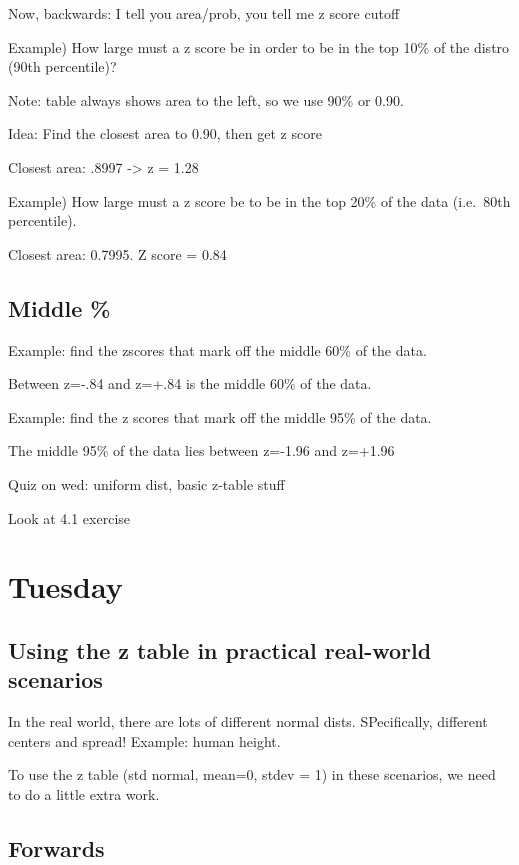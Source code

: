 \documentclass[]{article}
\begin{document}
Now, backwards: I tell you area/prob, you tell me z score cutoff

Example) How large must a z score be in order to be in the top 10\% of
the distro (90th percentile)?

Note: table always shows area to the left, so we use 90\% or 0.90.

Idea: Find the closest area to 0.90, then get z score

Closest area: .8997 -\textgreater{} z = 1.28

Example) How large must a z score be to be in the top 20\% of the data
(i.e.~80th percentile).

Closest area: 0.7995. Z score = 0.84

\hypertarget{middle}{%
\subsection{Middle \%}\label{middle}}

Example: find the zscores that mark off the middle 60\% of the data.

Between z=-.84 and z=+.84 is the middle 60\% of the data.

Example: find the z scores that mark off the middle 95\% of the data.

The middle 95\% of the data lies between z=-1.96 and z=+1.96

Quiz on wed: uniform dist, basic z-table stuff

Look at 4.1 exercise

\hypertarget{tuesday}{%
\section{Tuesday}\label{tuesday}}

\hypertarget{using-the-z-table-in-practical-real-world-scenarios}{%
\subsection{Using the z table in practical real-world
scenarios}\label{using-the-z-table-in-practical-real-world-scenarios}}

In the real world, there are lots of different normal dists.
SPecifically, different centers and spread! Example: human height.

To use the z table (std normal, mean=0, stdev = 1) in these scenarios,
we need to do a little extra work.

\hypertarget{forwards}{%
\subsection{Forwards}\label{forwards}}
\end{document}
